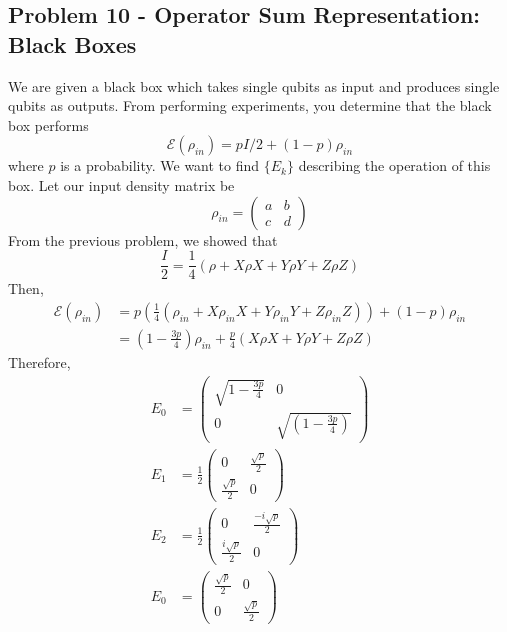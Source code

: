 \newpage
\subsection{Problem 10 - Operator Sum Representation: Black Boxes}
We are given a black box which takes single qubits as input and produces single qubits as outputs. From performing experiments, you determine that the black box performs 
\begin{equation}
    \mathcal{E}(\rho_{in}) = pI/2 + (1-p)\rho_{in}
\end{equation}
where $p$ is a probability. We want to find $\{E_k\}$ describing the operation of this box. 
Let our input density matrix be
\begin{equation}
    \rho_{in} = \begin{pmatrix}a & b \\ c & d\end{pmatrix}
\end{equation}
From the previous problem, we showed that
\begin{equation}
    \frac{I}{2} = \frac{1}{4}(\rho + X\rho X + Y\rho Y + Z\rho Z) 
\end{equation}
Then,
\begin{align}
    \mathcal{E}(\rho_{in}) &= p\left(\frac{1}{4}(\rho_{in} + X\rho_{in} X + Y\rho_{in} Y + Z\rho_{in} Z) \right) + (1-p)\rho_{in} \\
    &= \left(1-\frac{3p}{4}\right) \rho_{in} + \frac{p}{4}(X\rho X + Y\rho Y + Z\rho Z)
\end{align}
Therefore,
\begin{align}
    E_0 &= \begin{pmatrix}\sqrt{1 - \frac{3p}{4}} & 0 \\ 0 & \sqrt{(1 - \frac{3p}{4})}\end{pmatrix} \\
    E_1 &= \frac{1}{2}\begin{pmatrix}0 & \frac{\sqrt{p}}{2} \\ \frac{\sqrt{p}}{2} & 0\end{pmatrix} \\
    E_2 &= \frac{1}{2}\begin{pmatrix}0 & \frac{-i\sqrt{p}}{2} \\ \frac{i\sqrt{p}}{2} & 0\end{pmatrix} \\
    E_0 &= \begin{pmatrix}\frac{\sqrt{p}}{2} & 0 \\ 0 & \frac{\sqrt{p}}{2}\end{pmatrix} 
\end{align}



